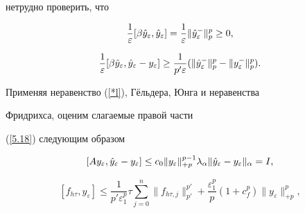 \begin{pf}
нетрудно проверить, что


\begin{equation}


\frac{1}{\varepsilon}[ \beta\Hat{y}_\varepsilon, \Hat{y}_\varepsilon ] =


\frac{1}{\varepsilon} \| \Hat{y}_\varepsilon^{-}\|^{p}_p


\ge 0, \label{5.23}


\end{equation}


\begin{equation}


\frac{1}{\varepsilon}[ \beta\Hat{y}_\varepsilon, \Hat{y}_\varepsilon


- y_\varepsilon] \ge


\frac{1}{p'\varepsilon }


(\|\Hat{y}_\varepsilon^{-}\|^p_p-


\| y_\varepsilon^{-}\|^p_p ). \label{5.24}


\end{equation}


Применяя неравенство (\ref{*l}), Г\"ельдера, Юнга и неравенства


Фридрихса, оценим слагаемые правой части


(\ref{5.18}) следующим образом


\begin{equation}


[ Ay_\varepsilon , \Hat{y}_\varepsilon-y_\varepsilon ] \le


c_{0} \| y_\varepsilon \|^{p-1}_{+p} \lambda_{\alpha}


\| \Hat{y}_\varepsilon -y_\varepsilon \|_{\alpha} = I, \label{5.25}


\end{equation}


%


\begin{equation}


[ f_{h\tau}, y_\varepsilon ] \le


\frac{1}{p' \varepsilon ^{p}_{1} }\tau\sum^{n}_{j=0}


\| f_{h\tau,j} \|^{p'}_{p'}+


 \frac{\varepsilon^{p}_{1} }{p} ( 1 +c_{f}^p )


 \| y_\varepsilon \| ^{p}_{+p},


\label{5.26}


\end{equation}



\end{pf}
